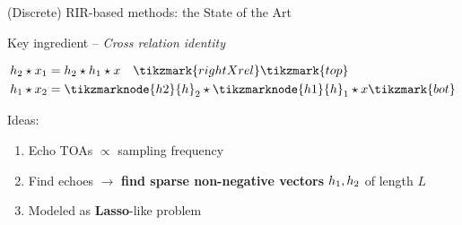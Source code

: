 \begin{frame}{(Discrete) RIR-based methods: the State of the Art \hfill\faBook}
\begin{block}{Key ingredient -- \textit{Cross relation identity}}
{\begin{equation*}
\begin{aligned}
                \discRIR_2 \discConv \discMic_1 &= \discRIR_2 \discConv \discRIR_1 \discConv \discSrc\hspace{1em}\tikzmark{rightXrel}\tikzmark{top}\\
                \discRIR_1 \discConv \discMic_2 &= \tikzmarknode{h2}{\discRIR}_2 \discConv \tikzmarknode{h1}{\discRIR}_1 \discConv \discSrc\tikzmark{bot}
             \end{aligned}
        \end{equation*}
        }


    \end{block}

    \pause[5]

    \begin{block}{Ideas:}
    \begin{enumerate}
        \small
        \item Echo TOAs $\propto$ sampling frequency
        \item Find echoes $\rightarrow$ \textbf{find sparse non-negative vectors} $h_1, h_2$ of length $L$
        \item Modeled as \textbf{Lasso}-like problem


\end{enumerate}
\end{block}
\end{frame}
